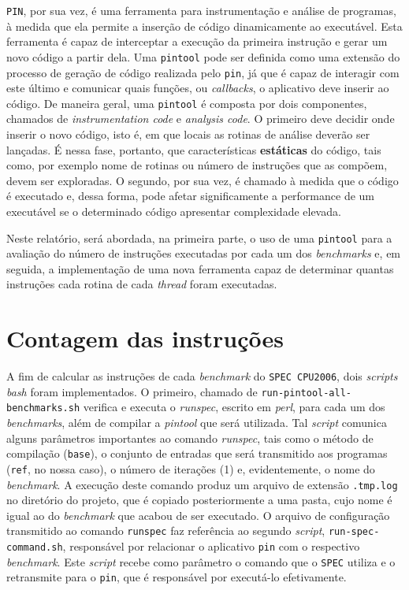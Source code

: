 \documentclass[12pt]{article}
\begin{document}
\texttt{PIN}, por sua vez, é uma ferramenta para instrumentação e análise de
programas, à medida que ela permite a inserção de código dinamicamente ao
executável. Esta ferramenta é capaz de interceptar a execução da primeira
instrução e gerar um novo código a partir dela. Uma \texttt{pintool} pode ser
definida como uma extensão do processo de geração de código realizada pelo
\texttt{pin}, já que é capaz de interagir com este último e comunicar quais
funções, ou \textit{callbacks}, o aplicativo deve inserir ao código. De maneira
geral, uma \texttt{pintool} é composta por dois componentes, chamados de
\textit{instrumentation code} e \textit{analysis code}. O primeiro deve decidir
onde inserir o novo código, isto é, em que locais as rotinas de análise deverão
ser lançadas. É nessa fase, portanto, que características \textbf{estáticas} do
código, tais como, por exemplo nome de rotinas ou número de instruções que as
compõem, devem ser exploradas. O segundo, por sua vez, é chamado à medida que o
código é executado e, dessa forma, pode afetar significamente a performance de
um executável se o determinado código apresentar complexidade elevada. 

Neste relatório, será abordada, na primeira parte, o uso de uma \texttt{pintool}
para a avaliação do número de instruções executadas por cada um dos
\textit{benchmarks} e, em seguida, a implementação de uma nova ferramenta capaz
de determinar quantas instruções cada rotina de cada \textit{thread} foram
executadas.

\section{Contagem das instruções} \label{sec:count}


A fim de calcular as instruções de cada \textit{benchmark} do \texttt{SPEC
CPU2006}, dois \textit{scripts bash} foram implementados. O primeiro, chamado de
\texttt{run-pintool-all-benchmarks.sh} verifica e executa o \textit{runspec},
escrito em \textit{perl}, para cada um dos \textit{benchmarks}, além de compilar
a \textit{pintool} que será utilizada. Tal \textit{script} comunica alguns
parâmetros importantes ao comando \textit{runspec}, tais como o método de
compilação (\texttt{base}), o conjunto de entradas que será transmitido aos
programas (\texttt{ref}, no nossa caso), o número de iterações (1) e,
evidentemente, o nome do \textit{benchmark}. A execução deste comando produz um
arquivo de extensão \texttt{.tmp.log} no diretório do projeto, que é copiado
posteriormente a uma pasta, cujo nome é igual ao do
\textit{benchmark} que acabou de ser executado. O arquivo de configuração
transmitido ao comando \texttt{runspec} faz referência ao segundo \textit{script},
\texttt{run-spec-command.sh}, responsável por relacionar o aplicativo
\texttt{pin} com o respectivo \textit{benchmark}. Este \textit{script} recebe
como parâmetro o comando que o \texttt{SPEC} utiliza e o retransmite para o
\texttt{pin}, que é responsável por executá-lo efetivamente.
\end{document}

